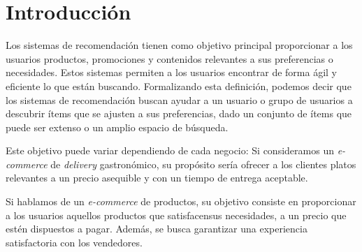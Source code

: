 \documentclass[11pt,a4paper,twoside]{thesis}
\begin{document}

\def\autor{Adrian Norberto Marino}
\def\tituloTesis{Sistemas de Recomendación Colaborativos}
\def\runtitulo{Resumen}
\def\runtitle{Sistemas de Recomendación Colaborativos}


\def\lugar{Buenos Aires, 2022}


%
\frontmatter
\pagestyle{empty}

%
%
\cleardoublepage
%
%
%
\tableofcontents
%
%
\mainmatter
\pagestyle{headings}
%
%
%
%


\chapter{Introducción}

Los sistemas de recomendación tienen como objetivo principal proporcionar a los
usuarios productos, promociones y contenidos relevantes a sus preferencias o
necesidades. Estos sistemas permiten a los usuarios encontrar de forma ágil y
eficiente lo que están buscando. Formalizando esta definición, podemos decir
que los sistemas de recomendación buscan ayudar a un usuario o grupo de
usuarios a descubrir ítems que se ajusten a sus preferencias, dado un conjunto
de ítems que puede ser extenso o un amplio espacio de búsqueda.

\begin{sloppypar}
	Este objetivo puede variar dependiendo de cada negocio: Si consideramos un
	\textit{e-commerce} de \textit{delivery} gastronómico, su propósito sería
	ofrecer a los clientes platos relevantes a un precio asequible y con un tiempo
	de entrega aceptable.
\end{sloppypar}

Si hablamos de un \textit{e-commerce} de productos, su objetivo consiste en
proporcionar a los usuarios aquellos productos que satisfacensus necesidades, a
un precio que estén dispuestos a pagar. Además, se busca garantizar una
experiencia satisfactoria con los vendedores.
\end{document}
